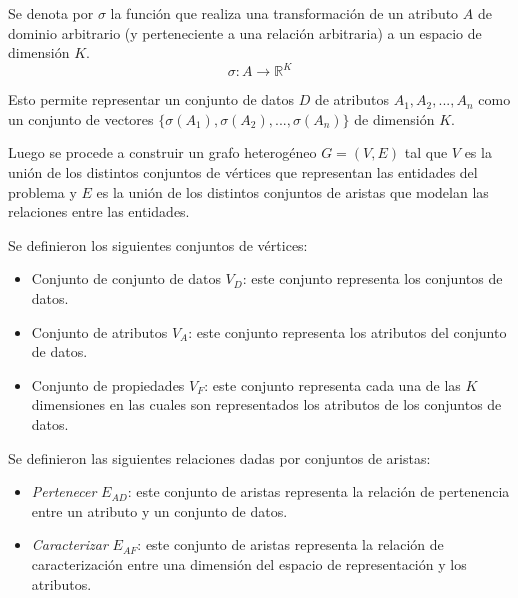 \begin{definition}
    Se denota por $\sigma$  la funci\'on que realiza una transformaci\'on
    de un atributo $A$ de dominio arbitrario (y perteneciente a una relaci\'on
    arbitraria) a un espacio de dimensi\'on $K$.
    $$
        \sigma : A \to \mathbb{R}^K
    $$
\end{definition}

Esto permite representar un conjunto de datos $D$ de atributos $A_1, A_2, ..., A_n$ como un
conjunto de vectores $\{\sigma(A_1), \sigma(A_2), ..., \sigma(A_n)\}$ de dimensi\'on $K$.

Luego se procede a construir un grafo heterog\'eneo $G = (V,E)$ tal que $V$ es la uni\'on
de los distintos conjuntos de v\'ertices que representan las entidades del problema y $E$ es la uni\'on de los distintos
conjuntos de aristas que modelan las relaciones entre las entidades.

Se definieron los siguientes conjuntos de v\'ertices:
\begin{itemize}
    \item Conjunto de conjunto de datos $V_D$: este conjunto representa los conjuntos de datos.
    \item Conjunto de atributos $V_A$: este conjunto representa los atributos del conjunto de datos.
    \item Conjunto de propiedades $V_F$: este conjunto representa cada una de las $K$ dimensiones en las cuales son representados los atributos de los conjuntos de datos.
\end{itemize}

Se definieron las siguientes relaciones dadas por conjuntos de aristas:
\begin{itemize}
    \item \textit{Pertenecer} $E_{AD}$: este conjunto de aristas representa la relaci\'on de pertenencia entre un atributo y un conjunto de datos.
    \item \textit{Caracterizar} $E_{AF}$: este conjunto de aristas representa la relaci\'on de caracterizaci\'on entre una dimensi\'on del espacio de representaci\'on y los atributos.
\end{itemize}




